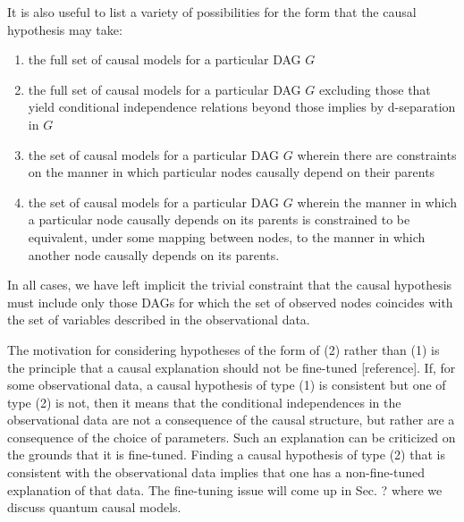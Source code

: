 It is also useful to list a variety of possibilities for the form that the causal hypothesis may take:
\begin{enumerate}
\item the full set of causal models for a particular DAG $G$
\item the full set of causal models for a particular DAG $G$ excluding those that yield conditional independence relations beyond those implies by d-separation in $G$
\item the set of causal models for a particular DAG $G$ wherein there are constraints on the manner in which particular nodes causally depend on their parents 
\item the set of causal models for a particular DAG $G$ wherein the manner in which a particular node causally depends on its parents is constrained to be equivalent, under some mapping between nodes, to the manner in which another node causally depends on its parents. 
\end{enumerate}
In all cases, we have left implicit the trivial constraint that the causal hypothesis must include only those DAGs for which the set of observed nodes coincides with the set of variables described in the observational data. 

The motivation for considering hypotheses of the form of (2) rather than (1) is the principle that a causal explanation should not be fine-tuned [reference].  If, for some observational data, a causal hypothesis of type (1) is consistent but one of type (2) is not, then it means that the conditional independences in the observational data are not a consequence of the causal structure, but rather are a consequence of the choice of parameters.  Such an explanation can be criticized on the grounds that it is fine-tuned.  Finding a causal hypothesis of type (2) that is consistent with the observational data implies that one has a non-fine-tuned explanation of that data.  The fine-tuning issue will come up in Sec. ? where we discuss quantum causal models. 



